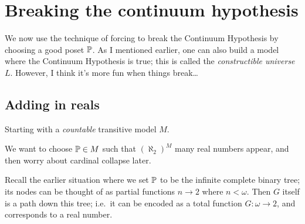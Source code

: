 \chapter{Breaking the continuum hypothesis}
\label{ch:break_CH}
We now use the technique of forcing to break the
Continuum Hypothesis by choosing a good poset $\mathbb P$.
As I mentioned earlier, one can also build a model
where the Continuum Hypothesis is true;
this is called the \emph{constructible universe} $L$.
However, I think it's more fun when things break\dots

%
%

\section{Adding in reals}
Starting with a \emph{countable} transitive model $M$.

We want to choose $\mathbb P \in M$ such that $(\aleph_2)^M$ many real numbers appear,
and then worry about cardinal collapse later.

Recall the earlier situation where we set $\mathbb P$ to be the infinite complete binary tree; its nodes can be thought of as partial functions $n \to 2$ where $n < \omega$.
Then $G$ itself is a path down this tree; i.e.\ it can be encoded as a total function $G \colon \omega \to 2$,
and corresponds to a real number.

